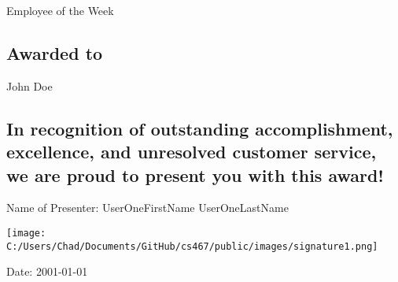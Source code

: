 \documentclass[landscape]{article}
\begin{document}
        \centering
        {\Huge Employee of the Week \par}

        \subsection*{Awarded to}
        John Doe

        \subsection*{ In recognition of outstanding accomplishment, excellence, and unresolved customer service, we are proud to present you with this award! }
        \vfill
        Name of Presenter: UserOneFirstName UserOneLastName

        \texttt{[image: C:/Users/Chad/Documents/GitHub/cs467/public/images/signature1.png]}

        Date: 2001-01-01

        
\end{document}

